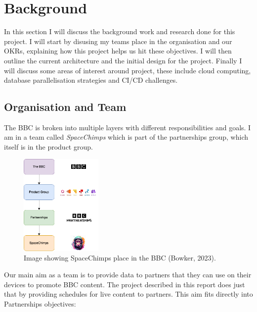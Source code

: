 \section{Background}
  In this section I will discuss the background work and research done for this project. I will start by disusing my teams place in the organisation and 
  our OKRs, explaining how this project helps us hit these objectives. I will then outline the current architecture and the initial design for the project.
  Finally I will discuss some areas of interest around project, these include cloud computing, database parallelisation strategies and CI/CD challenges.

  \subsection{Organisation and Team}
  The BBC is broken into multiple layers with different responsibilities and goals. I am in a team called \textit{SpaceChimps} which is part of
  the partnerships group, which itself is in the product group.

  \begin{figure}[H]
    \centering
    \includegraphics[width=4cm]{assets/bbcHierarchy.drawio.png}
    \caption{Image showing SpaceChimps place in the BBC (Bowker, 2023).}
    \label{fig:bbcHierarchy}
  \end{figure}

  Our main aim as a team is to provide data to partners that they can use on their devices to promote BBC content. The project described in this report does
  just that by providing schedules for live content to partners. This aim fits directly into Partnerships objectives:

